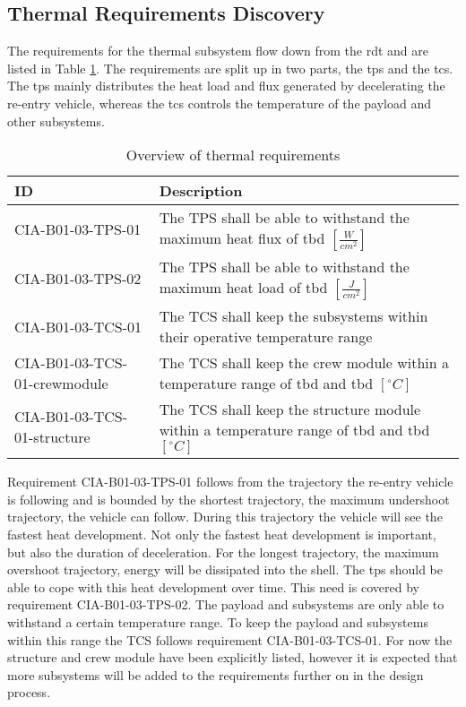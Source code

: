 \subsection{Thermal Requirements Discovery} \label{sec:therm}
The requirements for the thermal subsystem flow down from the \gls{rdt} and are listed in Table \ref{tab:thermalreq}. The requirements are split up in two parts, the \gls{tps} and the \gls{tcs}. The \gls{tps} mainly distributes the heat load and flux generated by decelerating the re-entry vehicle, whereas the \gls{tcs} controls the temperature of the payload and other subsystems.


\begin{table}[H]
	\caption{Overview of thermal requirements}
	\begin{tabular}{|p{}|p{}|}
    \hline
    ID          & Description                                                                                                      \\ \hline \hline
    CIA-B01-03-TPS-01 & The TPS shall be able to withstand the maximum heat flux of \gls{tbd} $ \left[\frac{W}{cm^2}\right] $               
\\ \hline
    CIA-B01-03-TPS-02 &  The TPS shall be able to withstand the maximum heat load of \gls{tbd} $ \left[\frac{J}{cm^2}\right] $               
\\ \hline
    CIA-B01-03-TCS-01 & The TCS shall keep the subsystems within their operative temperature range                                            
\\ \hline
    CIA-B01-03-TCS-01-crewmodule & The TCS shall keep the crew module within a temperature range of \gls{tbd} and \gls{tbd} $ \left[^{\circ}C\right] $                                        
\\ \hline
    CIA-B01-03-TCS-01-structure & The TCS shall keep the structure module within a temperature range of \gls{tbd} and \gls{tbd} $ \left[^{\circ}C\right] $                                        
\\ \hline

    \end{tabular}
    \label{tab:thermalreq}
\end{table}

Requirement CIA-B01-03-TPS-01 follows from the trajectory the re-entry vehicle is following and is bounded by the shortest trajectory, the maximum undershoot trajectory, the vehicle can follow. During this trajectory the vehicle will see the fastest heat development. Not only the fastest heat development is important, but also the duration of deceleration. For the longest trajectory, the maximum overshoot trajectory, energy will be dissipated into the shell. The \gls{tps} should be able to cope with this heat development over time. This need is covered by requirement CIA-B01-03-TPS-02. The payload and subsystems are only able to withstand a certain temperature range. To keep the payload and subsystems within this range the TCS follows requirement CIA-B01-03-TCS-01. For now the structure and crew module have been explicitly listed, however it is expected that more subsystems will be added to the requirements further on in the design process.

